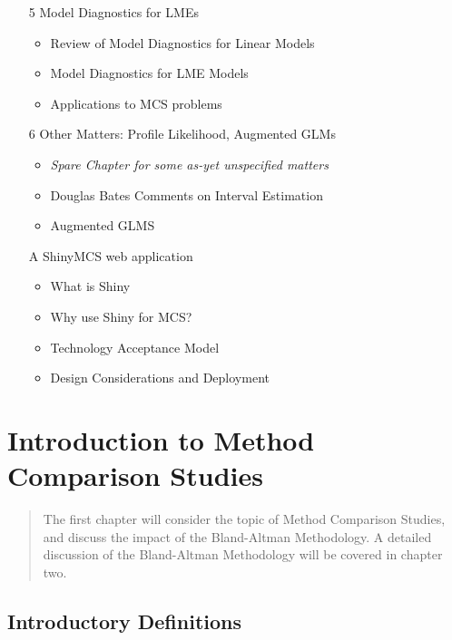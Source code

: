 \documentclass{report}
\begin{document}
\begin{itemize}
	
	\item[5]	Model Diagnostics for LMEs 
	\begin{itemize}	
		\item	Review of Model Diagnostics for Linear Models
		\item	Model Diagnostics for LME Models
		\item	Applications to MCS problems
	\end{itemize}		
	
	
	
	\item[6]	Other Matters: Profile Likelihood, Augmented GLMs	
	\begin{itemize}	
		\item   \textit{Spare Chapter for some as-yet unspecified matters}	
		\item	Douglas Bates Comments on Interval Estimation
		\item	Augmented GLMS
			
	\end{itemize}			
	
	\item[A]   ShinyMCS web application
	\begin{itemize}
		\item What is Shiny
		\item Why use Shiny for MCS?
		\item Technology Acceptance Model
		\item Design Considerations and Deployment
	\end{itemize}
\end{itemize}		
\newpage
\chapter{Introduction to Method Comparison Studies}
\begin{abstract}
The first chapter will consider the topic of Method Comparison Studies, and discuss the impact of the Bland-Altman Methodology. A detailed discussion of the Bland-Altman Methodology will be covered in chapter two.
\end{abstract}


\section{Introductory Definitions}
\end{document}
